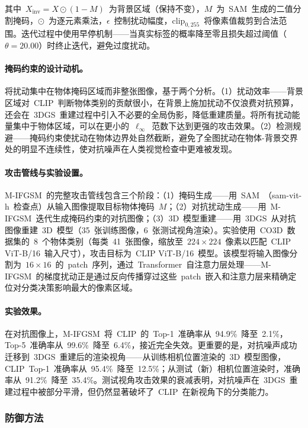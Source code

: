 其中~$X_{\text{inv}} = X \odot (1 - M)$~为背景区域（保持不变），$M$~为~SAM~生成的二值分割掩码，$\odot$~为逐元素乘法，$\epsilon$~控制扰动幅度，$\text{clip}_{0,255}$~将像素值裁剪到合法范围。迭代过程中使用早停机制——当真实标签的概率降至零且损失超过阈值（$\theta = 20.00$）时终止迭代，避免过度扰动。

\paragraph{掩码约束的设计动机。}
将扰动集中在物体掩码区域而非整张图像，基于两个分析。（1）扰动效率——背景区域对~CLIP~判断物体类别的贡献很小，在背景上施加扰动不仅浪费对抗预算，还会在~3DGS~重建过程中引入不必要的全局伪影，降低重建质量。将所有扰动能量集中于物体区域，可以在更小的~$\ell_\infty$~范数下达到更强的攻击效果。（2）检测规避——掩码约束使扰动在物体边界处自然截断，避免了全图扰动在物体-背景交界处的明显不连续性，使对抗噪声在人类视觉检查中更难被发现。

\paragraph{攻击管线与实验设置。}
M-IFGSM~的完整攻击管线包含三个阶段：（1）掩码生成——用~SAM~（sam-vit-h~检查点）从输入图像提取目标物体掩码~$M$；（2）对抗扰动生成——用~M-IFGSM~迭代生成掩码约束的对抗图像；（3）3D~模型重建——用~3DGS~从对抗图像重建~3D~模型（35~张训练图像，6~张测试视角渲染）。实验使用~CO3D~数据集的~8~个物体类别（每类~41~张图像，缩放至~$224 \times 224$~像素以匹配~CLIP ViT-B/16~输入尺寸），攻击目标为~CLIP ViT-B/16~模型。该模型将输入图像分割为~$16 \times 16$~的~patch~序列，通过~Transformer~自注意力层处理——M-IFGSM~的梯度扰动正是通过反向传播穿过这些~patch~嵌入和注意力层来精确定位对分类决策影响最大的像素区域。

\paragraph{实验效果。}
在对抗图像上，M-IFGSM~将~CLIP~的~Top-1~准确率从~94.9\%~降至~2.1\%，Top-5~准确率从~99.6\%~降至~6.4\%，接近完全失效。更重要的是，对抗噪声成功迁移到~3DGS~重建后的渲染视角——从训练相机位置渲染的~3D~模型图像，CLIP~Top-1~准确率从~95.4\%~降至~12.5\%；从测试（新）相机位置渲染时，准确率从~91.2\%~降至~35.4\%。测试视角攻击效果的衰减表明，对抗噪声在~3DGS~重建过程中被部分平滑，但仍然显著破坏了~CLIP~在新视角下的分类能力。

\subsubsection{防御方法}

